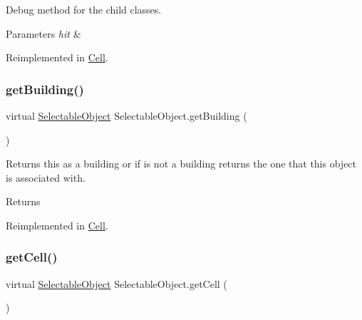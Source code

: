 Debug method for the child classes. 


\begin{DoxyParams}{Parameters}
{\em hit} & \\
\hline
\end{DoxyParams}


Reimplemented in \mbox{\hyperlink{class_cell_aecb362e44d7117cb4ecb1961092bcb28}{Cell}}.

\mbox{\label{class_selectable_object_a12caa058f4c53aa5debb1004f1169202}} 
\subsubsection{\texorpdfstring{get\+Building()}{getBuilding()}}
{\footnotesize\ttfamily virtual \mbox{\hyperlink{class_selectable_object}{Selectable\+Object}} Selectable\+Object.\+get\+Building (\begin{DoxyParamCaption}{ }\end{DoxyParamCaption})\hspace{0.3cm}{\ttfamily [virtual]}}



Returns this as a building or if is not a building returns the one that this object is associated with. 

\begin{DoxyReturn}{Returns}

\end{DoxyReturn}


Reimplemented in \mbox{\hyperlink{class_cell_ab32941221f7e2df38227961c8d8dbfec}{Cell}}.

\mbox{\label{class_selectable_object_a80e0f02ea8465ff2edfbaee1d5451dde}} 
\subsubsection{\texorpdfstring{get\+Cell()}{getCell()}}
{\footnotesize\ttfamily virtual \mbox{\hyperlink{class_selectable_object}{Selectable\+Object}} Selectable\+Object.\+get\+Cell (\begin{DoxyParamCaption}{ }\end{DoxyParamCaption})\hspace{0.3cm}{\ttfamily [virtual]}}



